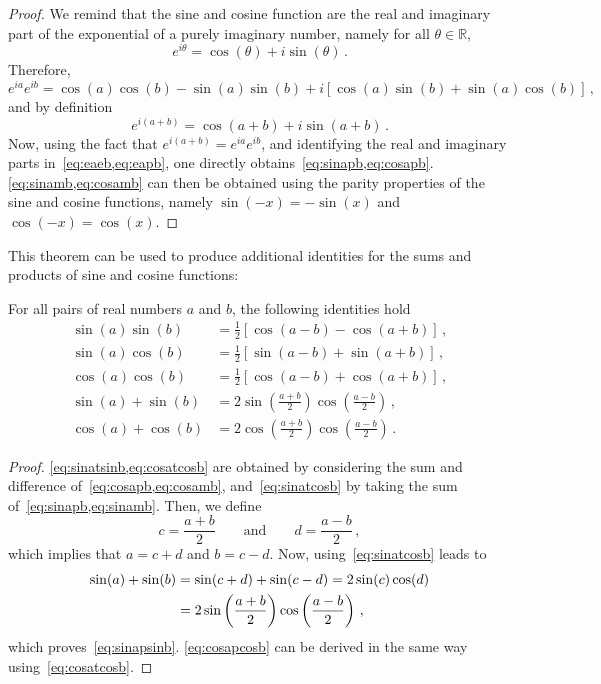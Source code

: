 \begin{proof}
  We remind that the sine and cosine function are the real and imaginary part of the
  exponential of a purely imaginary number, namely for all $\theta\in\mathbb{R}$,
  \begin{equation}
    e^{i\theta}=\cos(\theta)+i\sin(\theta)\,.
  \end{equation}
  Therefore,
  \begin{equation}
    e^{i a}e^{i b}=\cos(a)\cos(b)-\sin(a)\sin(b)+i[\cos(a)\sin(b)+\sin(a)\cos(b)]\,,
    \label{eq:eaeb}
  \end{equation}
  and by definition
  \begin{equation}
    e^{i(a+b)}=\cos(a+b)+i\sin(a+b)\,.\label{eq:eapb}
  \end{equation}
  Now, using the fact that $e^{i(a+b)}=e^{i a}e^{i b}$, and identifying the real and
  imaginary parts in~\cref{eq:eaeb,eq:eapb}, one directly
  obtains~\cref{eq:sinapb,eq:cosapb}. \cref{eq:sinamb,eq:cosamb} can then be obtained
  using the parity properties of the sine and cosine functions, namely $\sin(-x)=-\sin(x)$
  and $\cos(-x)=\cos(x)$.
\end{proof}
This theorem can be used to produce additional identities for the sums and products of
sine and cosine functions:
\begin{corollary}
  \label{cor:sumproduct}
  For all pairs of real numbers $a$ and $b$, the following identities hold
  \begin{align}
    \sin(a)\sin(b)&=\frac{1}{2}\left[\cos(a-b)-\cos(a+b)\right]\,,
    \label{eq:sinatsinb}\\
    \sin(a)\cos(b)&=\frac{1}{2}\left[\sin(a-b)+\sin(a+b)\right]\,,
    \label{eq:sinatcosb}\\
    \cos(a)\cos(b)&=\frac{1}{2}\left[\cos(a-b)+\cos(a+b)\right]\,,
    \label{eq:cosatcosb}\\
    \sin(a)+\sin(b)&=2\sin\left(\frac{a+b}{2}\right)\cos\left(\frac{a-b}{2}\right)\,,
    \label{eq:sinapsinb}\\
    \cos(a)+\cos(b)&=2\cos\left(\frac{a+b}{2}\right)\cos\left(\frac{a-b}{2}\right)\,.
    \label{eq:cosapcosb}
  \end{align}
\end{corollary}
\begin{proof}
  \cref{eq:sinatsinb,eq:cosatcosb} are obtained by considering the sum and difference
  of~\cref{eq:cosapb,eq:cosamb}, and~\cref{eq:sinatcosb} by taking the sum
  of~\cref{eq:sinapb,eq:sinamb}. Then, we define
  \begin{equation}
    c=\frac{a+b}{2}\qquad\text{and}\qquad d=\frac{a-b}{2}\,,
  \end{equation}
  which implies that $a=c+d$ and $b=c-d$. Now, using~\cref{eq:sinatcosb} leads to
  \begin{align}
    \sin(a)+\sin(b)&=\sin(c+d)+\sin(c-d)=2\sin(c)\cos(d)\notag\\
    &=2\sin\left(\frac{a+b}{2}\right)\cos\left(\frac{a-b}{2}\right)\,,
  \end{align}
  which proves~\cref{eq:sinapsinb}. \cref{eq:cosapcosb} can be derived in the same way
  using~\cref{eq:cosatcosb}.
\end{proof}

